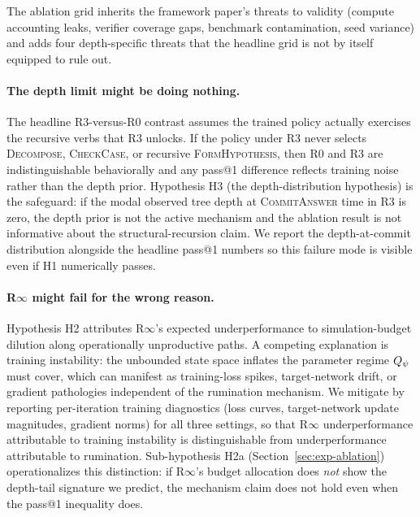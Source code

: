 The ablation grid inherits the framework paper's threats to validity
(compute accounting leaks, verifier coverage gaps, benchmark
contamination, seed variance) and adds four depth-specific threats
that the headline grid is not by itself equipped to rule out.

\paragraph{The depth limit might be doing nothing.}
The headline R3-versus-R0 contrast assumes the trained policy
actually exercises the recursive verbs that R3 unlocks. If the policy
under R3 never selects \textsc{Decompose}, \textsc{CheckCase}, or
recursive \textsc{FormHypothesis}, then R0 and R3 are indistinguishable
behaviorally and any pass@1 difference reflects training noise rather
than the depth prior. Hypothesis H3 (the depth-distribution
hypothesis) is the safeguard: if the modal observed tree depth at
\textsc{CommitAnswer} time in R3 is zero, the depth prior is not the
active mechanism and the ablation result is not informative about the
structural-recursion claim. We report the depth-at-commit distribution
alongside the headline pass@1 numbers so this failure mode is visible
even if H1 numerically passes.

\paragraph{R$\infty$ might fail for the wrong reason.}
Hypothesis H2 attributes R$\infty$'s expected underperformance to
simulation-budget dilution along operationally unproductive paths.
A competing explanation is training instability: the unbounded state
space inflates the parameter regime $Q_{\psi}$ must cover, which can
manifest as training-loss spikes, target-network drift, or gradient
pathologies independent of the rumination mechanism. We mitigate by
reporting per-iteration training diagnostics (loss curves,
target-network update magnitudes, gradient norms) for all three
settings, so that R$\infty$ underperformance attributable to training
instability is distinguishable from underperformance attributable to
rumination. Sub-hypothesis H2a (Section~\ref{sec:exp-ablation})
operationalizes this distinction: if R$\infty$'s budget allocation
does \emph{not} show the depth-tail signature we predict, the
mechanism claim does not hold even when the pass@1 inequality does.

